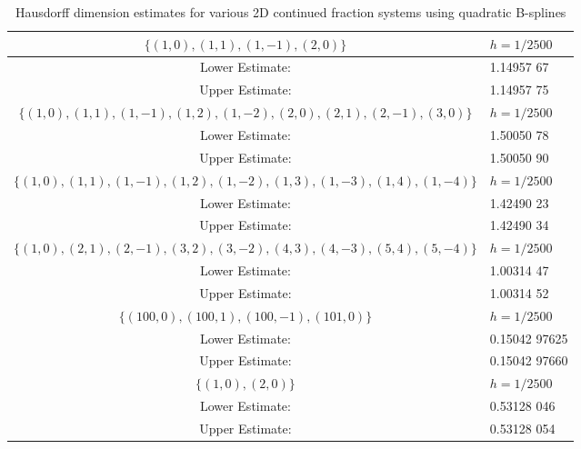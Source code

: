 \documentclass[10pt]{article}
\theoremstyle{definition}
\numberwithin{equation}{section}
\numberwithin{figure}{section}
\numberwithin{table}{section}
\begin{document}

\begin{table}[b]
\centering
\begin{tabular}{|c|l|}\hline
$\{(1,0),(1,1),(1,-1),(2,0)\}$&$h=1/2500$\\\hline
Lower Estimate: & 1.14957 67\\\hline
Upper Estimate: & 1.14957 75\\\hline\hline
$\{(1,0),(1,1),(1,-1),(1,2),(1,-2),(2,0),(2,1),(2,-1),(3,0)\}$&$h=1/2500$\\\hline
Lower Estimate: & 1.50050 78 \\\hline
Upper Estimate: & 1.50050 90\\\hline\hline
$\{(1,0),(1,1),(1,-1),(1,2),(1,-2),(1,3),(1,-3),(1,4),(1,-4)\}$&$h=1/2500$\\\hline
Lower Estimate: & 1.42490 23 \\\hline
Upper Estimate: & 1.42490 34\\\hline\hline
$\{(1,0),(2,1),(2,-1),(3,2),(3,-2),(4,3),(4,-3),(5,4),(5,-4)\}$&$h=1/2500$\\\hline
Lower Estimate: & 1.00314 47 \\\hline
Upper Estimate: & 1.00314 52\\\hline\hline
$\{(100,0),(100,1),(100,-1),(101,0)\}$&$h=1/2500$\\\hline
Lower Estimate: & 0.15042 97625 \\\hline
Upper Estimate: & 0.15042 97660 \\\hline\hline
$\{(1,0), (2,0)\}$ & $h=1/2500$\\\hline
Lower Estimate: & 0.53128 046\\\hline
Upper Estimate: & 0.53128 054\\\hline
\end{tabular}
\caption{Hausdorff dimension estimates for various 2D continued fraction systems using quadratic B-splines}
\label{table:2D}
\end{table}
\end{document}
